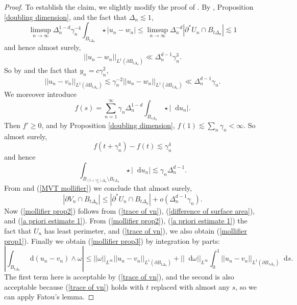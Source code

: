 \documentclass[reqno,12pt,letterpaper]{amsart}
\newcommand*\dif{\mathop{}\!\mathrm{d}}
\theoremstyle{definition}
\numberwithin{equation}{section}
\begin{document}
\begin{proof}
To establish the claim, we slightly modify the proof of \cite[Lemma 7.5]{Giusti77}.
By \cite[Lemma 7.2]{Giusti77}, Proposition \ref{doubling dimension}, and the fact that $\Delta_n \lesssim 1$,
$$\limsup_{n \to \infty} \Delta_n^{1 - d} \gamma_n^{-4} \int_{B_{t\Delta_n}} \star |u_n - w_n| \leq \limsup_{n \to \infty} \Delta_n^{-d} |\partial^* U_n \cap B_{t\Delta_n}| \lesssim 1$$
and hence almost surely,
$$||u_n - w_n||_{L^1(\partial B_{t\Delta_n})} \ll \Delta_n^{d - 1} \gamma_n^3.$$
So by \cite[Lemma 1.25]{Giusti77} and the fact that $y_n = c\gamma_n^2$,
\begin{equation}\label{trace of vn}
||u_n - v_n||_{L^1(\partial B_{t\Delta_n})} \lesssim \gamma_n^{-2} ||u_n - w_n||_{L^1(\partial B_{t\Delta_n})} \ll \Delta_n^{d - 1} \gamma_n.
\end{equation}
We moreover introduce 
$$f(s) = \sum_{n=1}^\infty \gamma_n \Delta_n^{1 - d} \int_{B_{s \Delta_n}} \star |\dif u_n|.$$
Then $f' \geq 0$, and by Proposition \ref{doubling dimension}, $f(1) \lesssim \sum_n \gamma_n < \infty$.
So almost surely,
$$f(t + \gamma_n^4) - f(t) \lesssim \gamma_n^4$$
and hence 
$$\int_{B_{(t + \gamma_n^4)\Delta_n} \setminus B_{t\Delta_n}} \star |\dif u_n| \lesssim \gamma_n \Delta_n^{d - 1}.$$
From \cite[Lemma 7.2]{Giusti77} and (\ref{MVT mollifier}) we conclude that almost surely,
\begin{equation}\label{difference of surface area}
|\partial V_n \cap B_{t\Delta_n}| \leq |\partial^* U_n \cap B_{t\Delta_n}| + o(\Delta_n^{d - 1} \gamma_n).
\end{equation}
Now (\ref{mollifier prop2}) follows from (\ref{trace of vn}), (\ref{difference of surface area}), and (\ref{a priori estimate 1}).
From (\ref{mollifier prop2}), (\ref{a priori estimate 1}) the fact that $U_n$ has least perimeter, and (\ref{trace of vn}), we also obtain (\ref{mollifier prop1}).
Finally we obtain (\ref{mollifier prop3}) by integration by parts: 
$$\left|\int_{B_{t\Delta_n}} \dif (u_n - v_n) \wedge \omega\right| \leq ||\omega||_{L^\infty} ||u_n - v_n||_{L^1(\partial B_{t\Delta_n})} + ||\dif \omega||_{L^\infty} \int_0^1 ||u_n - v_n||_{L^1(\partial B_{s\Delta_n})} \dif s.$$
The first term here is acceptable by (\ref{trace of vn}), and the second is also acceptable because (\ref{trace of vn}) holds with $t$ replaced with almost any $s$, so we can apply Fatou's lemma.
\end{proof}



\end{document}
